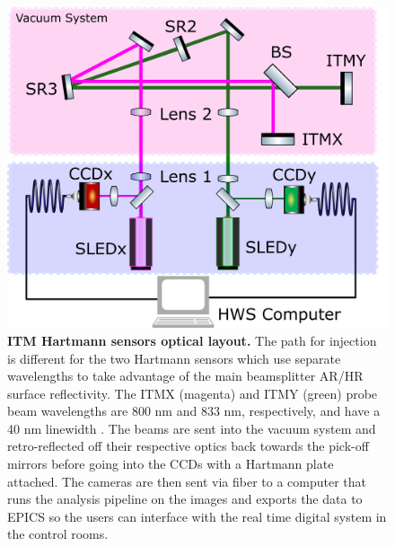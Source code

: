 \begin{figure}[ht]
	\centering
	\includegraphics[width=0.6\textheight]{../Figures/HWS_OpticalLayout.png}
	\caption[ITM Hartmann sensors optical layout.] 
	{\textbf{ITM Hartmann sensors optical layout.} The path for injection is different for the two Hartmann sensors which use separate wavelengths to take advantage of the main beamsplitter AR/HR surface reflectivity. The ITMX (magenta) and ITMY (green) probe beam wavelengths are 800 nm and 833 nm, respectively, and have a 40 nm linewidth \cite{AWC_current}. The beams are sent into the vacuum system and retro-reflected off their respective optics back towards the pick-off mirrors before going into the CCDs with a Hartmann plate attached.  The cameras are then sent via fiber to a computer that runs the analysis pipeline on the images and exports the data to EPICS so the users can interface with the real time digital system in the control rooms.}
	\label{fig:HWS_optical}
\end{figure}

